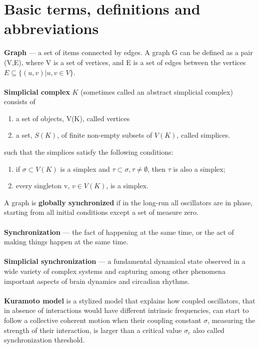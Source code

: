 \documentclass[draft]{article}
\newcommand\tab[1][1cm]{\hspace*{#1}}
\begin{document}
\section {Basic terms, definitions and abbreviations}
\tab \textbf{Graph} — a set of items connected by edges. A graph G can be defined as a pair (V,E), where V is a set of vertices, and E is a set of edges between the vertices  $E \subseteq \{(u,v) | u, v \in V\}$\cite{litlink1}.\\
~\\
\tab \textbf{Simplicial complex} $K$ (sometimes called an abstract simplicial complex) consists of
\begin{enumerate} 
\item a set of objects, V(K), called vertices
\item a set, $S(K)$, of finite non-empty subsets of $V(K)$, called simplices.
\end{enumerate}
such that the simplices satisfy the following conditions:
\begin{enumerate} 
\item if $\sigma\subset V(K)$ is a simplex and $\tau\subset\sigma, \tau\neq\emptyset$, then $\tau$ is also a simplex;
\item every singleton {v}, $v\in V(K)$, is a simplex\cite{litlink4}.
\end{enumerate}			
A graph is \textbf{globally synchronized} if in the long-run all oscillators are in phase, starting from all initial conditions except a set of measure zero\cite{litlink8}.\\
~\\
\tab \textbf{Synchronization} — the fact of happening at the same time, or the act of making things happen at the same time\cite{litlink2}.\\
~\\
\tab \textbf{Simplicial synchronization} — a fundamental dynamical state observed in a wide variety of complex systems and capturing among other phenomena important aspects of brain dynamics and circadian rhythms\cite{litlink3}.\\
~\\
\tab \textbf{Kuramoto model} is a stylized model that explains how coupled oscillators, that in absence of interactions would have different intrinsic frequencies, can start to follow a collective coherent motion when their coupling constant $\sigma$, measuring the strength of their interaction, is larger than a critical value $\sigma_c$ also called synchronization threshold\cite{litlink3}.\\
\end{document}
